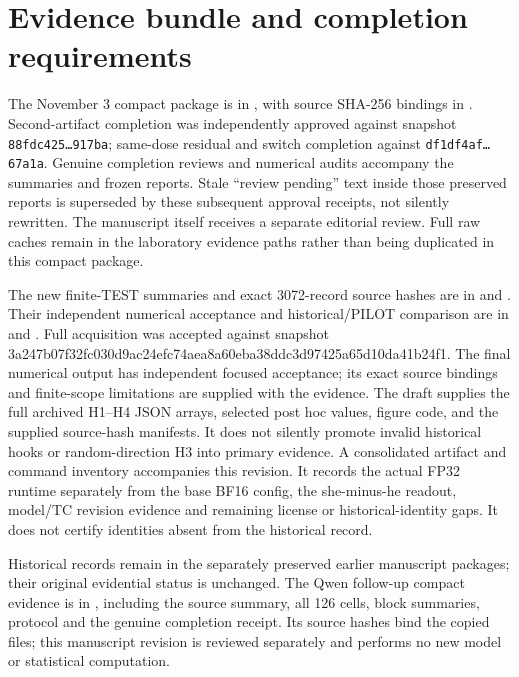 \section{Evidence bundle and completion requirements}
The November 3 compact package is in , with source SHA-256 bindings in . Second-artifact completion was independently approved against snapshot \texttt{88fdc425\ldots 917ba}; same-dose residual and switch completion against \texttt{df1df4af\ldots 67a1a}. Genuine completion reviews and numerical audits accompany the summaries and frozen reports. Stale ``review pending'' text inside those preserved reports is superseded by these subsequent approval receipts, not silently rewritten. The manuscript itself receives a separate editorial review. Full raw caches remain in the laboratory evidence paths rather than being duplicated in this compact package.

The new finite-TEST summaries and exact 3072-record source hashes are in  and . Their independent numerical acceptance and historical/PILOT comparison are in  and . Full acquisition was accepted against snapshot 3a247b07f32fc030d9ac24efc74aea8a60eba38ddc3d97425a65d10da41b24f1. The final numerical output has independent focused acceptance; its exact source bindings and finite-scope limitations are supplied with the evidence. The draft supplies the full archived H1--H4 JSON arrays, selected post hoc values, figure code, and the supplied source-hash manifests. It does not silently promote invalid historical hooks or random-direction H3 into primary evidence. A consolidated artifact and command inventory accompanies this revision. It records the actual FP32 runtime separately from the base BF16 config, the she-minus-he readout, model/TC revision evidence and remaining license or historical-identity gaps. It does not certify identities absent from the historical record.

Historical records remain in the separately preserved earlier manuscript packages; their original evidential status is unchanged. The Qwen follow-up compact evidence is in , including the source summary, all 126 cells, block summaries, protocol and the genuine completion receipt. Its source hashes bind the copied files; this manuscript revision is reviewed separately and performs no new model or statistical computation.

